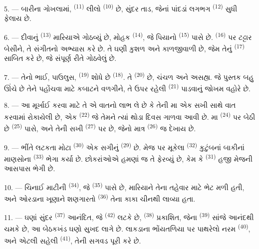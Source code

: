 5. --- બારીના ગોખલામાં, 
\textsuperscript{(11)} લીલો  \textsuperscript{(10)} છે,
સુંદર તાડ, જેનાં પાંદડાં લગભગ 
\textsuperscript{(12)} સુધી ફેલાય છે.

6. --- દીવાનું  \textsuperscript{(13)} મારિયાએ ગોઠવ્યું છે,
મોહક  \textsuperscript{(14)}, જે પિયાનો
\textsuperscript{(15)} પાસે છે.  \textsuperscript{(16)} પર
ટટ્ટાર બેસીને, તે સંગીતનો અભ્યાસ કરે છે. તે ઘણી કુશળ અને કાળજીવાળી છે,
જેમ તેનું  \textsuperscript{(17)} સાબિત કરે છે, જે
સંપૂર્ણ રીતે ગોઠવેલું છે.

\VUsaut{5.0mm}
\VUsaut{3.0mm}

7. --- તેનો ભાઈ, પાઉલુસ,  \textsuperscript{(19)} શોધે છે
 \textsuperscript{(18)}. તે 
\textsuperscript{(20)} છે, ચંચળ અને અસહ્ય. જે પુસ્તક બહુ ઊંચે છે તેને
પહોંચવા માટે કબાટને વળગીને, તે ઉપર રહેલી 
\textsuperscript{(21)} પાડવાનું જોખમ વહોરે છે.

8. --- આ મૂર્ખાઈ કરવા માટે તે એ વાતનો લાભ લે છે કે તેની મા એક સખી
સાથે વાત કરવામાં રોકાયેલી છે, એક  \textsuperscript{(22)}
જે તેમને ત્યાં થોડા દિવસ ગાળવા આવી છે. મા 
\textsuperscript{(24)} પર બેઠી છે 
\textsuperscript{(25)} પાસે, અને તેની સખી 
\textsuperscript{(27)} પર છે, જેનો માત્ર 
\textsuperscript{(26)} જ દેખાય છે.

9. --- ભીંતે લટકતા મોટા  \textsuperscript{(30)} એક
સગીનું  \textsuperscript{(29)} છે. મેજ પર મૂકેલા
 \textsuperscript{(32)} કુટુંબનાં બાકીનાં માણસોના
 \textsuperscript{(33)} ભેગા કર્યા છે. છોકરાંઓએ હમણાં જ તે
ફેરવ્યું છે, કેમ કે  \textsuperscript{(31)} હજી મેજની
આસપાસ ભેગી છે.

10. --- ચિનાઈ માટીની  \textsuperscript{(34)}, જે
 \textsuperscript{(35)} પાસે છે, મારિયાને તેના
તહેવાર માટે ભેટ મળી હતી, અને ઓરડાના ખૂણાને શણગારતો 
\textsuperscript{(36)} તેના કાકા ચીનથી લાવ્યા હતા.

11. --- ઘણાં સુંદર  \textsuperscript{(37)} આનંદિત,
જે  \textsuperscript{(42)} લટકે છે, 
\textsuperscript{(38)} પ્રકાશિત, જેના 
\textsuperscript{(39)} સાંજે આનંદથી ચમકે છે, આ બેઠકખંડ ઘણો સુખદ લાગે
છે. લાકડાના ભોંયતળિયા પર પાથરેલો નરમ 
\textsuperscript{(40)}, અને એટલી સહેલી 
\textsuperscript{(41)}, તેની સગવડ પૂરી કરે છે.

